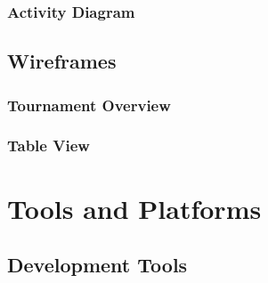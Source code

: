 
\subsubsection*{Activity Diagram}


\subsection{Wireframes}

\subsubsection*{Tournament Overview}


\subsubsection*{Table View}


\section{Tools and Platforms}
\label{sec:tools}

\subsection{Development Tools}

